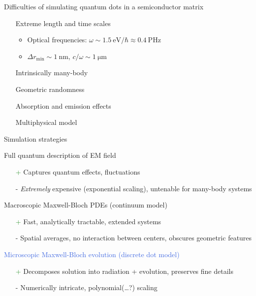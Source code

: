 \documentclass[aspectratio=169, usenames, dvipsnames]{beamer}
\begin{document}
\begin{frame}{Difficulties of simulating quantum dots in a semiconductor matrix}
  \begin{itemize}
    \item[] Extreme length and time scales
      \begin{itemize}
        \item Optical frequencies: $\omega \sim \SI{1.5}{\eV \per \hbar} \approx \SI{0.4}{\peta\hertz}$
        \item $\Delta r_\text{min} \sim \SI{1}{\nano\meter}$, $c/\omega \sim \SI{1}{\micro\meter}$
      \end{itemize}
    \item[] Intrinsically many-body
    \item[] Geometric randomness
    \item[] Absorption and emission effects
    \item[] Multiphysical model
  \end{itemize}
\end{frame}

\begin{frame}{Simulation strategies}
  \begin{block}{Full quantum description of EM field}
    \begin{itemize}
      \item[\textcolor{ForestGreen}{+}] Captures quantum effects, fluctuations
      \item[\textcolor{BrickRed}{-}] \emph{Extremely} expensive (exponential scaling), untenable for many-body systems
    \end{itemize}
  \end{block}

  \begin{block}{Macroscopic Maxwell-Bloch PDEs (continuum model)}
    \begin{itemize}
      \item[\textcolor{ForestGreen}{+}] Fast, analytically tractable, extended systems
      \item[\textcolor{BrickRed}{-}] Spatial averages, no interaction between centers, obscures geometric features
    \end{itemize}
  \end{block}

  \begin{block}{\textcolor{RoyalBlue}{Microscopic Maxwell-Bloch evolution (discrete dot model)}}
    \begin{itemize}
      \item[\textcolor{ForestGreen}{+}] Decomposes solution into radiation + evolution, preserves fine details
      \item[\textcolor{BrickRed}{-}] Numerically intricate, polynomial(\ldots?) scaling
    \end{itemize}
  \end{block}
\end{frame}
\end{document}
